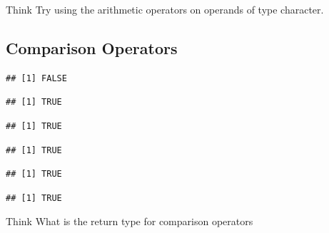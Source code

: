 \documentclass[12pt]{book}\usepackage{knitr}
\begin{document}
\begin{DIY}{Think}
Try using the arithmetic operators on operands of type character. 
\end{DIY}

\subsection{Comparison Operators}
\begin{knitrout}
\color{fgcolor}\begin{kframe}
\begin{alltt}
 \hlopt{<}  
\end{alltt}
\begin{verbatim}
## [1] FALSE
\end{verbatim}
\begin{alltt}
 \hlopt{<=}  
\end{alltt}
\begin{verbatim}
## [1] TRUE
\end{verbatim}
\begin{alltt}
 \hlopt{>}  
\end{alltt}
\begin{verbatim}
## [1] TRUE
\end{verbatim}
\begin{alltt}
 \hlopt{>=}  
\end{alltt}
\begin{verbatim}
## [1] TRUE
\end{verbatim}
\begin{alltt}
 \hlopt{==}  
\end{alltt}
\begin{verbatim}
## [1] TRUE
\end{verbatim}
\begin{alltt}
 \hlopt{!=}  
\end{alltt}
\begin{verbatim}
## [1] TRUE
\end{verbatim}
\end{kframe}
\end{knitrout}
\begin{DIY}{Think}
What is the return type for comparison operators
\end{DIY}
\end{document}
